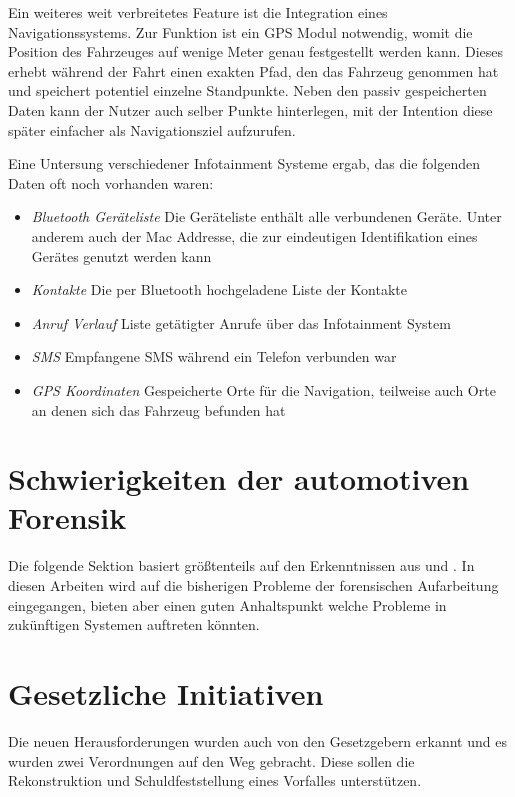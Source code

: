 \documentclass[conference,compsoc,final,a4paper]{IEEEtran}
\begin{document}
Ein weiteres weit verbreitetes Feature ist die Integration eines Navigationssystems.
Zur Funktion ist ein \ac{GPS} Modul notwendig, womit die Position des Fahrzeuges auf wenige Meter genau festgestellt werden kann.
Dieses erhebt während der Fahrt einen exakten Pfad, den das Fahrzeug genommen hat und speichert potentiel einzelne Standpunkte.
Neben den passiv gespeicherten Daten kann der Nutzer auch selber Punkte hinterlegen, mit der Intention diese später einfacher als 
Navigationsziel aufzurufen.

Eine Untersung verschiedener Infotainment Systeme ergab, das die folgenden Daten oft noch vorhanden waren:~\cite{Lacroix2017}
\begin{itemize}
  \item \emph{Bluetooth Geräteliste} Die Geräteliste enthält alle verbundenen Geräte. Unter anderem auch der Mac Addresse, die zur eindeutigen Identifikation eines Gerätes genutzt werden kann
  \item \emph{Kontakte} Die per Bluetooth hochgeladene Liste der Kontakte
  \item \emph{Anruf Verlauf} Liste getätigter Anrufe über das Infotainment System
  \item \emph{SMS} Empfangene SMS während ein Telefon verbunden war
  \item \emph{GPS Koordinaten} Gespeicherte Orte für die Navigation, teilweise auch Orte an denen sich das Fahrzeug befunden hat
\end{itemize}

\section{Schwierigkeiten der automotiven Forensik}

Die folgende Sektion basiert größtenteils auf den Erkenntnissen aus  und .
In diesen Arbeiten wird auf die bisherigen Probleme der forensischen Aufarbeitung eingegangen, bieten aber einen guten Anhaltspunkt
welche Probleme in zukünftigen Systemen auftreten könnten.



\section{Gesetzliche Initiativen}

Die neuen Herausforderungen wurden auch von den Gesetzgebern erkannt und es wurden zwei Verordnungen auf den Weg gebracht.
Diese sollen die Rekonstruktion und Schuldfeststellung eines Vorfalles unterstützen.
\end{document}

